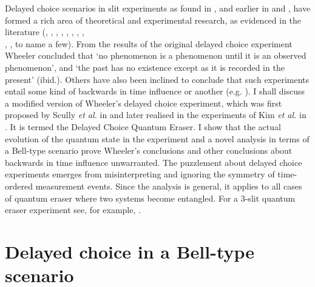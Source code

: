 \documentclass[12pt]{article}
\numberwithin{equation}{section}
\begin{document}
Delayed choice scenarios in slit experiments as found in \cite{wheeler1978past}, and earlier in \cite{von1941deutung} and \cite{bohr1996discussion}, have formed a rich area of theoretical and experimental research, as evidenced in the literature (\cite{eichmann1993young}, \cite{englert2000quantitative},  \cite{doi:10.1119/1.19257}, \cite{doi:10.1119/1.19258}, \cite{Kim1999}, \cite{walborn2002double}, \cite{kwiat2004science}, \cite{aharonov2005time},\\
\cite{Peres2000}, \cite{Egg2013}, to name a few). 
From the results of the original delayed choice experiment Wheeler concluded that  `no phenomenon is a phenomenon until it is an observed phenomenon', and `the past has
no existence except as it is recorded in the present' (ibid.). Others have also been inclined to conclude that such experiments entail some kind of backwards in time influence or another (e.g. \cite{doi:10.1119/1.19258}). I shall discuss a modified version of Wheeler's delayed choice experiment, which was first proposed by  Scully\textit{ et al.} in \cite{scully1982quantum} and later realised in the experiments of Kim \textit{et al.} in \cite{Kim1999}. It is termed the Delayed Choice Quantum Eraser. I show that the actual evolution of the quantum state in the experiment and a novel analysis in terms of a Bell-type scenario prove Wheeler's conclusions and other conclusions about backwards in time influence  unwarranted. The puzzlement about delayed choice experiments emerges from misinterpreting and ignoring the symmetry of time-ordered measurement events.  Since the analysis is general, it applies to all cases of quantum eraser where two systems become entangled. For a 3-slit quantum eraser experiment see, for example, \cite{shah2017quantum}. 


\section{Delayed choice in a Bell-type scenario}
\label{Bell}
\end{document}
